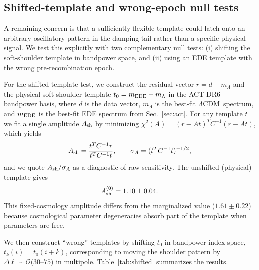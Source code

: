 \documentclass[twocolumn,showpacs,preprintnumbers,amsmath,amssymb,prd]{revtex4-2}
\newcommand{\lcdm}{$\Lambda$CDM}
\begin{document}
\subsection{Shifted-template and wrong-epoch null tests}
\label{sec:shifted_template}

A remaining concern is that a sufficiently flexible template could latch onto
an arbitrary oscillatory pattern in the damping tail rather than a specific
physical signal. We test this explicitly with two complementary null tests:
(i) shifting the soft-shoulder template in bandpower space, and
(ii) using an EDE template with the wrong pre-recombination epoch.

For the shifted-template test, we construct the residual vector
$r = d - m_\Lambda$ and the physical soft-shoulder template
$t_0 = m_{\rm EDE} - m_\Lambda$ in the ACT DR6 bandpower basis, where
$d$ is the data vector, $m_\Lambda$ is the best-fit \lcdm\ spectrum, and
$m_{\rm EDE}$ is the best-fit EDE spectrum from Sec.~\ref{sec:act}.
For any template $t$ we fit a single amplitude $A_{\rm sh}$ by minimizing
$\chi^2(A) = (r - A t)^T C^{-1} (r - A t)$, which yields
\begin{equation}
  A_{\rm sh} = \frac{t^T C^{-1} r}{t^T C^{-1} t}, \qquad
  \sigma_{A} = (t^T C^{-1} t)^{-1/2},
\end{equation}
and we quote $A_{\rm sh}/\sigma_{A}$ as a diagnostic of raw sensitivity.
The unshifted (physical) template gives
\begin{equation}
  A_{\rm sh}^{(0)} = 1.10 \pm 0.04.
\end{equation}
This fixed-cosmology amplitude differs from the marginalized value 
($1.61 \pm 0.22$) because cosmological parameter degeneracies absorb 
part of the template when parameters are free.

We then construct ``wrong'' templates by shifting $t_0$ in bandpower index
space, $t_k(i) = t_0(i + k)$, corresponding to moving the shoulder pattern
by $\Delta\ell \sim \mathcal{O}(30$--$75)$ in multipole. Table~\ref{tab:shifted}
summarizes the results.
\end{document}
